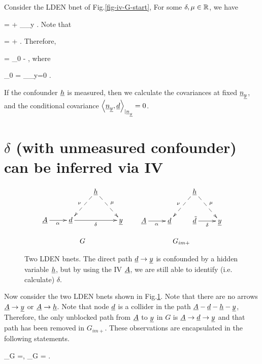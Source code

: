 Consider 
the LDEN bnet of Fig.\ref{fig-iv-G-start},
For some $\delta, \mu\in { \mathbb{R}}$, we have

\beq
\rvy = \delta \rvd +
\underbrace{ \mu \rvh + \rvu_\rvy}_{\rvn_y}
\;.
\eeq
Note that

\beq
\av{\rvy, \rvd} = \delta \av{\rvd, \rvd}
+ \av{\rvn_\rvy, \rvd}
\;.
\eeq
Therefore,

\beq
\delta =
\delta_0
-
\;,
\eeq  
where


\beq
\delta_0 = _{\rvn_y=0}
\;.
\eeq



If the confounder ${\underline{h}}$
is measured, then
we calculate 
the covariances at fixed ${\underline{n}}_{\underline{y}}$,
and 
the conditional covariance 
$\left\langle{\underline{n}}_{\underline{y}}, {\underline{d}}\right\rangle_{|{\underline{n}}_{\underline{y}}}=0$.

\section{$\delta$
(with unmeasured confounder)
can be
inferred via IV}



\begin{figure}[h!]
$$
\begin{array}{ccc}
\xymatrix{
&&\rvh\ar@{-->}[dl]_\nu\ar@{-->}[dr]^\mu
\\
\rvA\ar[r]_\alpha
&\rvd\ar[rr]_\delta
&&\rvy
}
&&
\xymatrix{
&&\rvh\ar@{-->}[dl]_\nu\ar@{-->}[dr]^\mu
\\
\rvA\ar[r]_\alpha
&\rvd&
\rvtd\ar[r]_\delta
&\rvy}
\\
\\
G&&G_{im+}
\end{array}
$$
\caption{
Two LDEN bnets. The direct path ${\underline{d}}\rightarrow{\underline{y}}$
is confounded by
a hidden variable ${\underline{h}}$, but
by using the IV ${\underline{A}}$, we are still
able to 
identify (i.e. calculate)
$\delta$.
}
\label{fig-iv-G-im}
\end{figure}

Now consider the two LDEN bnets 
shown in Fig.\ref{fig-iv-G-im}.
Note that there are no arrows
${\underline{A}}\rightarrow{\underline{y}}$
or 
${\underline{A}}\rightarrow{\underline{h}}$. Note that
node ${\underline{d}}$ is a collider
in the path 
${\underline{A}}-{\underline{d}}-{\underline{h}}-{\underline{y}}$, 
Therefore,
the only unblocked path
from ${\underline{A}}$ to 
${\underline{y}}$ in $G$ 
is ${\underline{A}}\rightarrow{\underline{d}}\rightarrow{\underline{y}}$
and that path has been
removed in $G_{im+}$. These
observations are 
encapsulated in the following statements.

\beq
\rvd\perp_{G} \rvy =, 
\;\; \rvA\perp_{G} \rvy= 
\;.
\eeq

